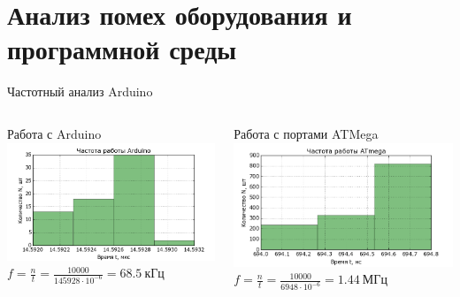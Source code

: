 \section{Анализ помех оборудования и программной среды}

\begin{frame}{Частотный анализ Arduino}
    \begin{columns}
        \centering
        Работа с Arduino
        \includegraphics[width=1\linewidth]{../Figures/ardhist.png}
        \vfill
        $f = \frac{n}{t} = \frac{10000}{145928 \cdot 10^{-6}} = 68.5~\textrm{кГц}$

        \centering
        Работа с портами ATMega
        \includegraphics[width=1\linewidth]{../Figures/athist.png}
        \vfill
        $f = \frac{n}{t} = \frac{10000}{6948 \cdot 10^{-6}} = 1.44~\textrm{МГц}$
    \end{columns}

\end{frame}

